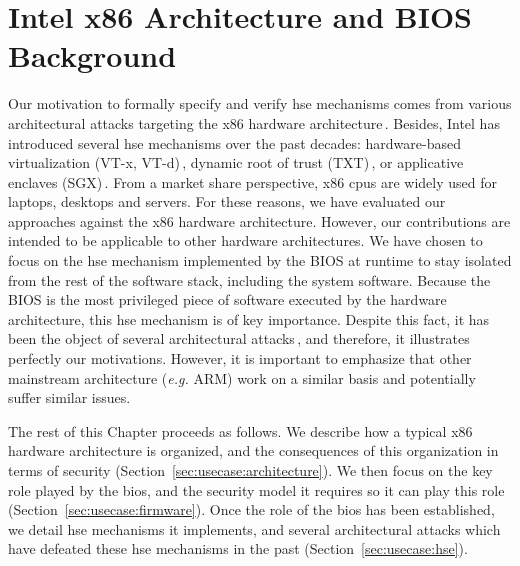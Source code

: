 \chapter{Intel x86 Architecture and BIOS Background}
\label{chapter:usecase}


\vspace{1cm}\noindent
%
Our motivation to formally specify and verify \ac{hse} mechanisms comes from
various architectural attacks targeting the x86 hardware
architecture\,\cite{duflot2009smram,wojtczuk2009smram,kallenberg2015racecondition,domas2015sinkhole,kovah2015senter}.
%
Besides, Intel has introduced several \ac{hse} mechanisms over the past decades:
hardware-based virtualization (VT-x, VT-d)\,\cite[Volume 3, Chapter
23]{intel2014manual}, dynamic root of trust (TXT)\,\cite{intel2015txt}, or
applicative enclaves (SGX)\,\cite[Volume 3, Chapter
36]{intel2014manual}\cite{costan2016sgxexplained}.
%
From a market share perspective, x86 \acp{cpu} are widely used for laptops,
desktops and servers.
%
For these reasons, we have evaluated our approaches against the x86 hardware
architecture.
%
However, our contributions are intended to be applicable to other hardware
architectures.
%
We have chosen to focus on the \ac{hse} mechanism implemented by the BIOS at
runtime to stay isolated from the rest of the software stack, including the
system software.
%
Because the BIOS is the most privileged piece of software executed by the
hardware architecture, this \ac{hse} mechanism is of key importance.
%
Despite this fact, it has been the object of several architectural
attacks\,\cite{duflot2009smram,wojtczuk2009smram,domas2015sinkhole}, and
therefore, it illustrates perfectly our motivations.
%
However, it is important to emphasize that other mainstream architecture
(\emph{e.g.}  ARM) work on a similar basis and potentially suffer similar
issues.

The rest of this Chapter proceeds as follows.
%
We describe how a typical x86 hardware architecture is organized, and the
consequences of this organization in terms of security
(Section~\ref{sec:usecase:architecture}).
%
We then focus on the key role played by the \ac{bios}, and the security model it
requires so it can play this role (Section~\ref{sec:usecase:firmware}).
%
Once the role of the \ac{bios} has been established, we detail \ac{hse}
mechanisms it implements, and several architectural attacks which have defeated
these \ac{hse} mechanisms in the past (Section~\ref{sec:usecase:hse}).

